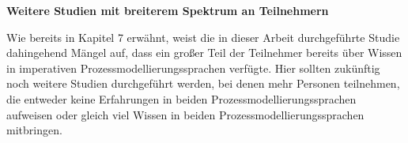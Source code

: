 \textbf{Weitere Studien mit breiterem Spektrum an Teilnehmern}

Wie bereits in Kapitel 7 erwähnt, weist die in dieser Arbeit durchgeführte Studie dahingehend Mängel auf, dass ein großer Teil der Teilnehmer bereits über Wissen in imperativen Prozessmodellierungssprachen verfügte. Hier sollten zukünftig noch weitere Studien durchgeführt werden, bei denen mehr Personen teilnehmen, die entweder keine Erfahrungen in beiden Prozessmodellierungssprachen aufweisen oder gleich viel Wissen in beiden Prozessmodellierungssprachen mitbringen.\newline





